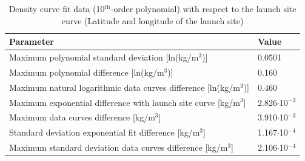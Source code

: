
%

\begin{table}[H]
\begin{center}
\caption{Density curve fit data (10$^\text{th}$-order polynomial) with respect to the launch site curve (Latitude and longitude of the launch site)}
\label{tab:fitDeviationsDen}
{\renewcommand{\arraystretch}{1.2} %
\begin{tabular}{|l|l|}
\hline
\textbf{Parameter} & \textbf{Value} \\ \hline \hline 
Maximum polynomial standard deviation [ln(kg/m$^{3}$)] & 0.0501 \\ \hline

  Maximum polynomial difference [ln(kg/m$^{3}$)] & 0.160 \\ \hline
  
Maximum natural logarithmic data curves difference [ln(kg/m$^{3}$)] & 0.460 \\ \hline
  
Maximum exponential difference with launch site curve [kg/m$^{3}$] & 2.826$\cdot$10$^{-3}$ \\ \hline
    
Maximum data curves difference [kg/m$^{3}$] & 3.910$\cdot$10$^{-3}$ \\ \hline
    
Standard deviation exponential fit difference [kg/m$^{3}$] & 1.167$\cdot$10$^{-4}$ \\ \hline 
      
Maximum standard deviation data curves difference [kg/m$^{3}$] & 2.106$\cdot$10$^{-4}$ \\ \hline
\end{tabular}}
\end{center}
\end{table}



